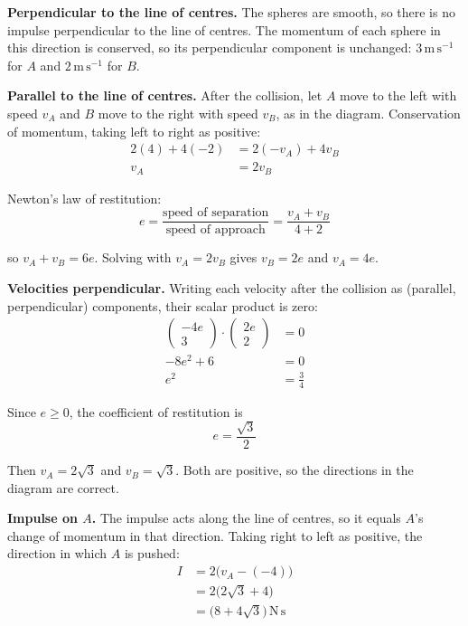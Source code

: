 \documentclass[leqno]{article}
\begin{document}
\begin{enumerate}[
  label=\textbf{\arabic*.},
  leftmargin=*,
  topsep=0pt,
  partopsep=0pt,
  parsep=0pt
]
\begin{djsSolution}
\textbf{Perpendicular to the line of centres.} The spheres are smooth, so there is no impulse perpendicular to the line of centres. The momentum of each sphere in this direction is conserved, so its perpendicular component is unchanged: \(3\,\mathrm{m\,s^{-1}}\) for \(A\) and \(2\,\mathrm{m\,s^{-1}}\) for \(B\).

\textbf{Parallel to the line of centres.} After the collision, let \(A\) move to the left with speed \(v_A\) and \(B\) move to the right with speed \(v_B\), as in the diagram. Conservation of momentum, taking left to right as positive:
\begin{align*}
2(4)+4(-2)&=2(-v_A)+4v_B\\
v_A&=2v_B
\end{align*}

Newton's law of restitution:
\[
e=\frac{\text{speed of separation}}{\text{speed of approach}}=\frac{v_A+v_B}{4+2}
\]

so \(v_A+v_B=6e\). Solving with \(v_A=2v_B\) gives \(v_B=2e\) and \(v_A=4e\).

\textbf{Velocities perpendicular.} Writing each velocity after the collision as (parallel, perpendicular) components, their scalar product is zero:
\begin{align*}
\begin{pmatrix}-4e\\3\end{pmatrix}\cdot\begin{pmatrix}2e\\2\end{pmatrix}&=0\\
-8e^2+6&=0\\
e^2&=\frac34
\end{align*}

Since \(e\geq0\), the coefficient of restitution is
\[
e=\frac{\sqrt3}{2}
\]

Then \(v_A=2\sqrt3\) and \(v_B=\sqrt3\). Both are positive, so the directions in the diagram are correct.

\textbf{Impulse on \(A\).} The impulse acts along the line of centres, so it equals \(A\)'s change of momentum in that direction. Taking right to left as positive, the direction in which \(A\) is pushed:
\begin{align*}
I&=2\bigl(v_A-(-4)\bigr)\\
&=2\bigl(2\sqrt3+4\bigr)\\
&=\bigl(8+4\sqrt3\bigr)\,\mathrm{N\,s}
\end{align*}


\end{djsSolution}
\end{enumerate}
\end{document}

